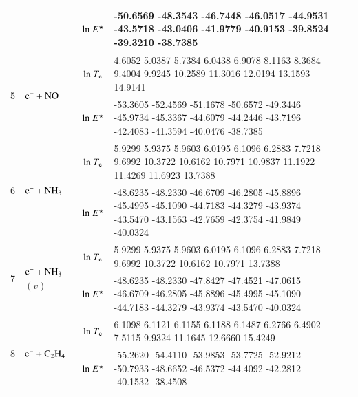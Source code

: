 \begin{table}[!htbp]
\begin{threeparttable}
\begin{tabular*}{1.1\textwidth}{l@{\extracolsep{\fill}}lcll}
  &  & ${\rm ln}~E^\star$     & \tiny      -50.6569  -48.3543  -46.7448  -46.0517  -44.9531  -43.5718  -43.0406  -41.9779  -40.9153  -39.8524  -39.3210  -38.7385

  \\     
  \midrule  
  
  \multirow{2}{*}{5} &  \multirow{2}{*}{ $\rm e^- + NO  $   } & ${\rm ln}~T_{\rm e}$  & \tiny    4.6052    5.0387    5.7384    6.0438    6.9078    8.1163    8.3684    9.4004    9.9245   10.2589   11.3016   12.0194   13.1593   14.9141
 \\
  &  & ${\rm ln}~E^\star$     & \tiny    -53.3605  -52.4569  -51.1678  -50.6572  -49.3446  -45.9734  -45.3367  -44.6079  -44.2446  -43.7196  -42.4083  -41.3594  -40.0476  -38.7385
  \\     
  \midrule  
        
  \multirow{2}{*}{6} &  \multirow{2}{*}{ $\rm e^- + NH_3  $   } & ${\rm ln}~T_{\rm e}$  & \tiny  5.9299    5.9375    5.9603    6.0195    6.1096    6.2883    7.7218    9.6992   10.3722   10.6162   10.7971   10.9837   11.1922   11.4269   11.6923      13.7388   \\
  
  &  & ${\rm ln}~E^\star$     & \tiny     -48.6235  -48.2330  -46.6709  -46.2805  -45.8896  -45.4995  -45.1090  -44.7183  -44.3279  -43.9374  -43.5470  -43.1563  -42.7659  -42.3754  -41.9849 
 -40.0324  \\
    \midrule  
  \multirow{2}{*}{7} &  \multirow{2}{*}{ $\rm e^- + NH_3$$(v)$   } & ${\rm ln}~T_{\rm e}$  & \tiny    5.9299    5.9375    5.9603    6.0195    6.1096    6.2883    7.7218    9.6992   10.3722   10.6162   10.7971         13.7388
  \\
  
  &  & ${\rm ln}~E^\star$     & \tiny     -48.6235  -48.2330  -47.8427  -47.4521  -47.0615  -46.6709  -46.2805  -45.8896  -45.4995  -45.1090  -44.7183  -44.3279  -43.9374  -43.5470    -40.0324
  \\  
  
    \midrule  
  \multirow{2}{*}{8} &  \multirow{2}{*}{ $\rm e^- + C_2 H_4$   } & ${\rm ln}~T_{\rm e}$  & \tiny         6.1098    6.1121    6.1155    6.1188    6.1487    6.2766    6.4902    7.5115    9.9324   11.1645   12.6660   15.4249
  \\
  
  &  & ${\rm ln}~E^\star$     & \tiny       -55.2620  -54.4110  -53.9853  -53.7725  -52.9212  -50.7933  -48.6652  -46.5372  -44.4092  -42.2812  -40.1532  -38.4508
  \\  
  

\end{tabular*}
\end{threeparttable}
\end{table}
